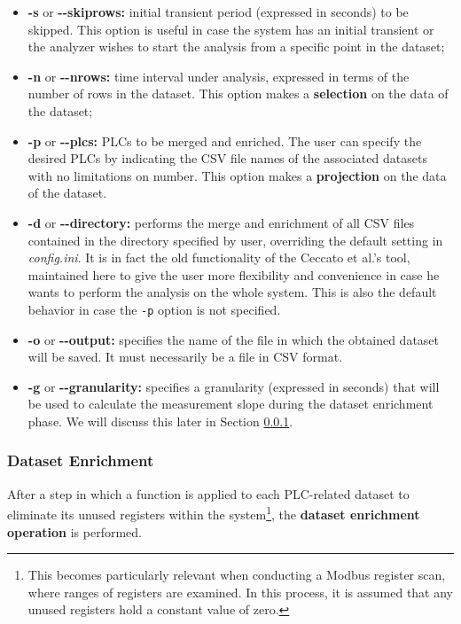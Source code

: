 \begin{itemize}
	\item \textbf{-s} or \textbf{{-}{-}skiprows:} initial transient period (expressed in seconds) to be skipped. This option is useful in case the system has an initial transient or the analyzer wishes to start the analysis from a specific point in the dataset;
	
	\item \textbf{-n} or \textbf{{-}{-}nrows:} time interval under analysis, expressed in terms of the number of rows in the dataset.\newline
	This option makes a \textbf{selection} on the data of the dataset;
	
	\item \textbf{-p} or \textbf{{-}{-}plcs:} PLCs to be merged and enriched. The user can specify the desired PLCs by indicating the CSV file names of the associated datasets with no limitations on number.\newline
	This option makes a \textbf{projection} on the data of the dataset.
	
	\item \textbf{-d} or \textbf{{-}{-}directory:} performs the merge and enrichment of all CSV files contained in the directory specified by user, overriding the default setting in \textit{config.ini}. It is in fact the old functionality of the Ceccato et al.'s tool, maintained here to give the user more flexibility and convenience in case he wants to perform the analysis on the whole system. This is also the default behavior in case the \texttt{-p} option is not specified.
	
	\item \textbf{-o} or \textbf{{-}{-}output:} specifies the name of the file in which the obtained dataset will be saved. It must necessarily be a file in CSV format.
	
	\item \textbf{-g} or \textbf{{-}{-}granularity:} specifies a granularity (expressed in seconds) that will be used to calculate the measurement slope during the dataset enrichment phase. We will discuss this later in Section \ref{subsubsec:4_dataset_enrichment}.
\end{itemize}
\vfill

\subsubsection{Dataset Enrichment}
\label{subsubsec:4_dataset_enrichment}
After a step in which a function is applied to each PLC-related dataset to eliminate its unused registers within the system\footnote{This becomes particularly relevant when conducting a Modbus register scan, where ranges of registers are examined. In this process, it is assumed that any unused registers hold a constant value of zero.}, the \textbf{dataset enrichment operation} is performed.

